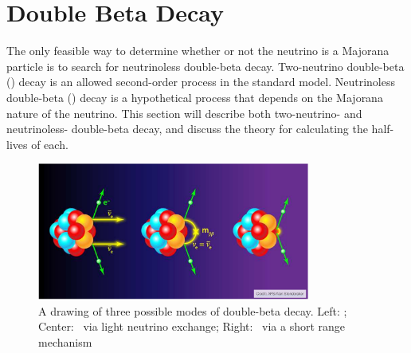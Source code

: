 \documentclass[/main.tex]{subfiles}
\begin{document}
\section{Double Beta Decay}
The only feasible way to determine whether or not the neutrino is a Majorana particle is to search for neutrinoless double-beta decay.
Two-neutrino double-beta (\tnbb) decay is an allowed second-order process in the standard model.
Neutrinoless double-beta (\znbb) decay is a hypothetical process that depends on the Majorana nature of the neutrino.
This section will describe both two-neutrino- and neutrinoless- double-beta decay, and discuss the theory for calculating the half-lives of each.
\begin{figure}[t]
  \centering
  \includegraphics[width=0.8\textwidth]{bbdecay}
  \caption[Double Beta Decay]{\label{fig:bbdecay}
    A drawing of three possible modes of double-beta decay. Left: \tnbb; Center: \znbb\ via light neutrino exchange; Right: \znbb\ via a short range mechanism
  }
\end{figure}
\end{document}
